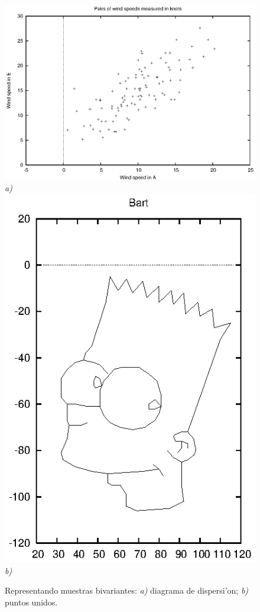 \documentclass[spanish,12pt,a4paper]{article}
\begin{document}
\begin{description}
\begin{figure}
\begin{center}
\includegraphics[scale=1.0]{dataplot3.eps} \\
\emph{a)} \\ 
\includegraphics[scale=1.0]{dataplot4.eps} \\
\emph{b)} \\
\caption{Representando muestras bivariantes: \emph{a)} diagrama de dispersi'on; \emph{b)} puntos unidos.}
\label{fig2}
\end{center}
\end{figure}


\end{description}
\end{document}

